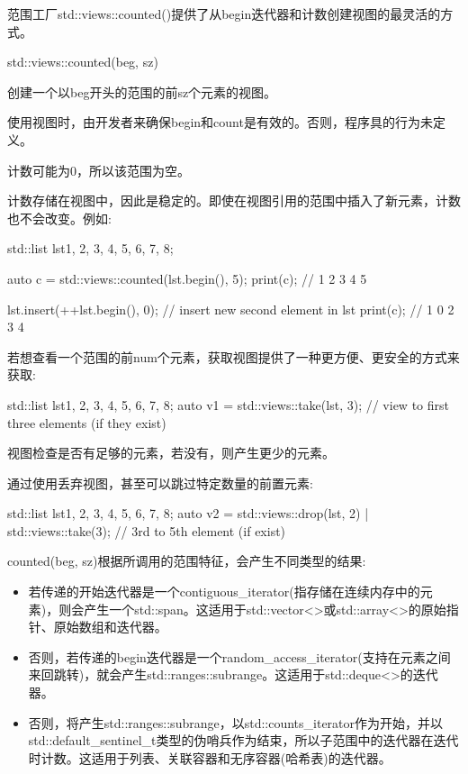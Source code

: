 
范围工厂std::views::counted()提供了从begin迭代器和计数创建视图的最灵活的方式。

\begin{cpp}
std::views::counted(beg, sz)
\end{cpp}

创建一个以beg开头的范围的前sz个元素的视图。

使用视图时，由开发者来确保begin和count是有效的。否则，程序具的行为未定义。

计数可能为0，所以该范围为空。

计数存储在视图中，因此是稳定的。即使在视图引用的范围中插入了新元素，计数也不会改变。例如:

\begin{cpp}
std::list lst{1, 2, 3, 4, 5, 6, 7, 8};

auto c = std::views::counted(lst.begin(), 5);
print(c); // 1 2 3 4 5

lst.insert(++lst.begin(), 0); // insert new second element in lst
print(c); // 1 0 2 3 4
\end{cpp}

若想查看一个范围的前num个元素，获取视图提供了一种更方便、更安全的方式来获取:

\begin{cpp}
std::list lst{1, 2, 3, 4, 5, 6, 7, 8};
auto v1 = std::views::take(lst, 3); // view to first three elements (if they exist)
\end{cpp}

视图检查是否有足够的元素，若没有，则产生更少的元素。

通过使用丢弃视图，甚至可以跳过特定数量的前置元素:

\begin{cpp}
std::list lst{1, 2, 3, 4, 5, 6, 7, 8};
auto v2 = std::views::drop(lst, 2) | std::views::take(3); // 3rd to 5th element (if exist)
\end{cpp}


counted(beg, sz)根据所调用的范围特征，会产生不同类型的结果:

\begin{itemize}
\item
若传递的开始迭代器是一个contiguous\_iterator(指存储在连续内存中的元素)，则会产生一个std::span。这适用于std::vector<>或std::array<>的原始指针、原始数组和迭代器。

\item
否则，若传递的begin迭代器是一个random\_access\_iterator(支持在元素之间来回跳转)，就会产生std::ranges::subrange。这适用于std::deque<>的迭代器。

\item
否则，将产生std::ranges::subrange，以std::counts\_iterator作为开始，并以std::default\_sentinel\_t类型的伪哨兵作为结束，所以子范围中的迭代器在迭代时计数。这适用于列表、关联容器和无序容器(哈希表)的迭代器。
\end{itemize}

